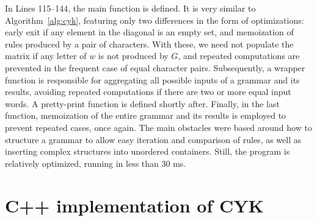 \documentclass[12pt]{article}
\begin{document}
In Lines 115--144, the main function is defined. It is very similar to
Algorithm~\ref{alg:cyk}, featuring only two differences in the form of
optimizations: early exit if any element in the diagonal is an empty set, and
memoization of rules produced by a pair of characters. With these, we need not
populate the matrix if any letter of $w$ is not produced by $G$, and repeated
computations are prevented in the frequent case of equal character pairs.
Subsequently, a wrapper function is responsible for aggregating all possible
inputs of a grammar and its results, avoiding repeated computations if there
are two or more equal input words. A pretty-print function is defined shortly
after. Finally, in the last function, memoization of the entire grammar and its
results is employed to prevent repeated cases, once again. The main obstacles
were based around how to structure a grammar to allow easy iteration and
comparison of rules, as well as inserting complex structures into unordered
containers. Still, the program is relatively optimized, running in less than 30
ms.




\appendix

\section{C++ implementation of CYK}\label{app:impl}

\end{document}
